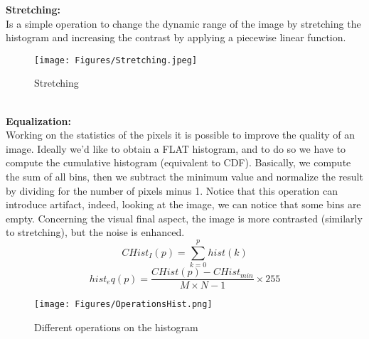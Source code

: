 \textbf{Stretching:}
\\Is a simple operation to change the dynamic range of the image by stretching the histogram and increasing the contrast by applying a piecewise linear function. 
\begin{figure}[h]
    \centering
    \texttt{[image: Figures/Stretching.jpeg]}
    \caption{Stretching}
    \label{fig:enter-label}
\end{figure}   
\\ 
\textbf{Equalization:}
\\Working on the statistics of the pixels it is possible to improve the quality of an image. Ideally we’d like to obtain a FLAT histogram, and to do so we have to compute the cumulative histogram (equivalent to CDF).
Basically, we compute the sum of all bins, then we subtract the minimum value and normalize the result by dividing for the number of pixels minus 1.
Notice that this operation can introduce artifact, indeed, looking at the image, we can notice that some bins are empty. Concerning the visual final aspect, the image is more contrasted (similarly to stretching), but the noise is enhanced.
    \[
        CHist_I(p) = \sum_{k=0}^{p} hist(k)
    \]
    \[
        hist_eq(p) = \frac{CHist(p)-CHist_{min}}{M \times N-1}\times 255
    \]
\begin{figure}[h]
    \centering
    \texttt{[image: Figures/OperationsHist.png]}
    \caption{Different operations on the histogram}
    \label{fig:enter-label}
\end{figure}
    
